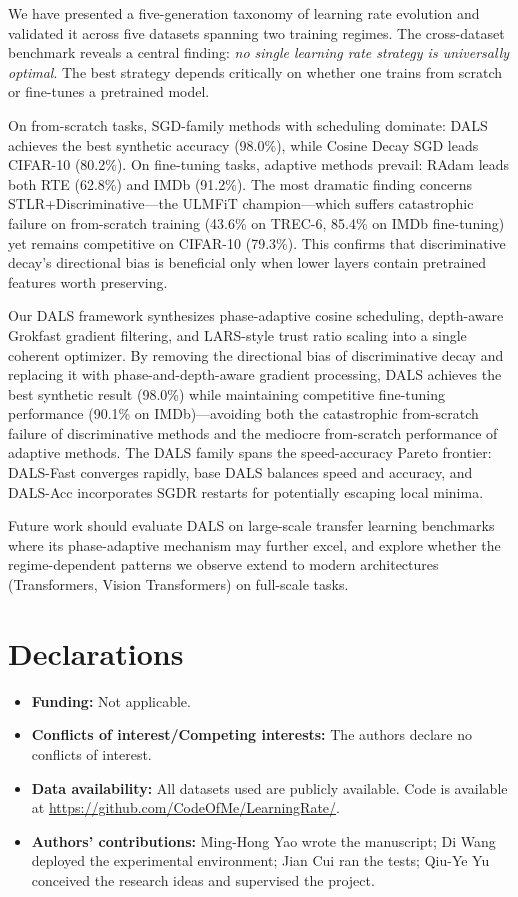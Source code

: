 \documentclass[a4paper,fleqn]{cas-dc}
\begin{document}
We have presented a five-generation taxonomy of learning rate evolution and validated it across five datasets spanning two training regimes. The cross-dataset benchmark reveals a central finding: \emph{no single learning rate strategy is universally optimal}. The best strategy depends critically on whether one trains from scratch or fine-tunes a pretrained model.

On from-scratch tasks, SGD-family methods with scheduling dominate: DALS achieves the best synthetic accuracy (98.0\%), while Cosine Decay SGD leads CIFAR-10 (80.2\%). On fine-tuning tasks, adaptive methods prevail: RAdam leads both RTE (62.8\%) and IMDb (91.2\%). The most dramatic finding concerns STLR+Discriminative---the ULMFiT champion---which suffers catastrophic failure on from-scratch training (43.6\% on TREC-6, 85.4\% on IMDb fine-tuning) yet remains competitive on CIFAR-10 (79.3\%). This confirms that discriminative decay's directional bias is beneficial only when lower layers contain pretrained features worth preserving.

Our DALS framework synthesizes phase-adaptive cosine scheduling, depth-aware Grokfast gradient filtering, and LARS-style trust ratio scaling into a single coherent optimizer. By removing the directional bias of discriminative decay and replacing it with phase-and-depth-aware gradient processing, DALS achieves the best synthetic result (98.0\%) while maintaining competitive fine-tuning performance (90.1\% on IMDb)---avoiding both the catastrophic from-scratch failure of discriminative methods and the mediocre from-scratch performance of adaptive methods. The DALS family spans the speed-accuracy Pareto frontier: DALS-Fast converges rapidly, base DALS balances speed and accuracy, and DALS-Acc incorporates SGDR restarts for potentially escaping local minima.

Future work should evaluate DALS on large-scale transfer learning benchmarks where its phase-adaptive mechanism may further excel, and explore whether the regime-dependent patterns we observe extend to modern architectures (Transformers, Vision Transformers) on full-scale tasks.

\section*{Declarations}

\begin{itemize}
\item \textbf{Funding:} Not applicable.
\item \textbf{Conflicts of interest/Competing interests:} The authors declare no conflicts of interest.
\item \textbf{Data availability:} All datasets used are publicly available. Code is available at \url{https://github.com/CodeOfMe/LearningRate/}.
\item \textbf{Authors' contributions:} Ming-Hong Yao wrote the manuscript; Di Wang deployed the experimental environment; Jian Cui ran the tests; Qiu-Ye Yu conceived the research ideas and supervised the project.
\end{itemize}

\printcredits



\end{document}
